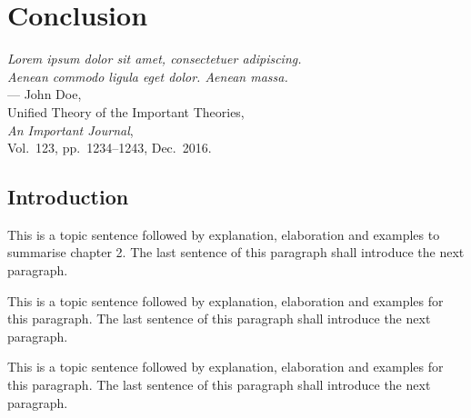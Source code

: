 

%
%
\chapter{Conclusion}
\label{ch:conclusion}

\begin{flushright}
{\slshape Lorem ipsum dolor sit amet, consectetuer adipiscing.}\\
{\slshape Aenean commodo ligula eget dolor. Aenean massa.}\\
\medskip
--- John Doe,\\
Unified Theory of the Important Theories,\\
{\slshape An Important Journal},\\
Vol.~123, pp.~1234--1243, Dec.~2016.\\
\end{flushright}

\bigskip

\section{Introduction}
\label{sec:ch_8_introduction}

This is a topic sentence followed by explanation, elaboration and examples to summarise chapter 2. The last sentence of this paragraph shall introduce the next paragraph. \lipsum[1]

This is a topic sentence followed by explanation, elaboration and examples for this paragraph. The last sentence of this paragraph shall introduce the next paragraph. \lipsum[1]

This is a topic sentence followed by explanation, elaboration and examples for this paragraph. The last sentence of this paragraph shall introduce the next paragraph. \lipsum[1]

